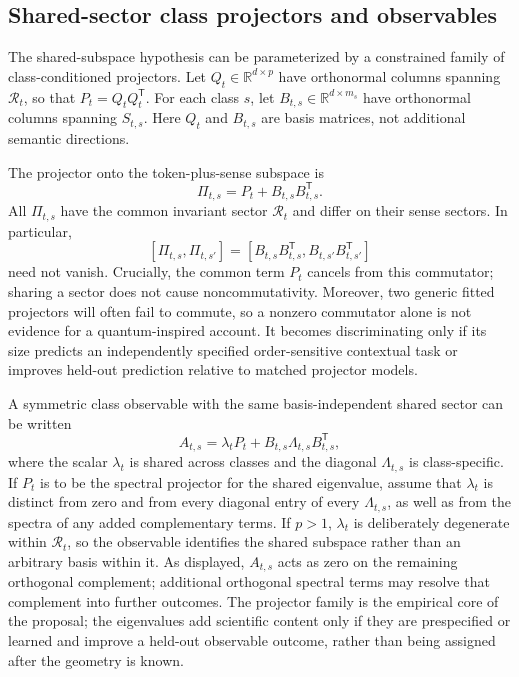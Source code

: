 \documentclass[
  aps,
  reprint,
  superscriptaddress,
  floatfix,
  nofootinbib,
  longbibliography
]{revtex4-2}
\newcommand{\R}{\mathbb{R}}
\newcommand{\T}{^{\mathsf{T}}}
\begin{document}
\subsection{Shared-sector class projectors and observables}
\label{sec:observables}

The shared-subspace hypothesis can be parameterized by a constrained family
of class-conditioned projectors.  Let $Q_t\in\R^{d\times p}$ have orthonormal columns
spanning $\mathcal R_t$, so that $P_t=Q_tQ_t\T$.  For each class $s$, let
$B_{t,s}\in\R^{d\times m_s}$ have orthonormal columns spanning $S_{t,s}$.
Here $Q_t$ and $B_{t,s}$ are basis matrices, not additional semantic
directions.

The projector onto the token-plus-sense subspace is
%
\begin{equation}
\label{eq:context-projector}
\Pi_{t,s}=P_t+B_{t,s}B_{t,s}\T .
\end{equation}
%
All $\Pi_{t,s}$ have the common invariant sector $\mathcal R_t$ and differ on
their sense sectors.  In particular,
%
\begin{equation}
\label{eq:projector-commutator}
[\Pi_{t,s},\Pi_{t,s'}]
=
[B_{t,s}B_{t,s}\T,B_{t,s'}B_{t,s'}\T]
\end{equation}
%
need not vanish.  Crucially, the common term $P_t$ cancels from this
commutator; sharing a sector does not cause noncommutativity.  Moreover, two
generic fitted projectors will often fail to commute, so a nonzero commutator
alone is not evidence for a quantum-inspired account.  It becomes
discriminating only if its size predicts an independently specified
order-sensitive contextual task or improves held-out prediction relative to
matched projector models.

A symmetric class observable with the same basis-independent shared sector
can be written
%
\begin{equation}
\label{eq:context-observable}
A_{t,s}
=\lambda_t P_t
 +B_{t,s}\Lambda_{t,s}B_{t,s}\T,
\end{equation}
%
where the scalar $\lambda_t$ is shared across classes and the diagonal
$\Lambda_{t,s}$ is class-specific.  If $P_t$ is to be the spectral projector
for the shared eigenvalue, assume that $\lambda_t$ is distinct from zero and
from every diagonal entry of every $\Lambda_{t,s}$, as well as from the spectra
of any added complementary terms.  If $p>1$, $\lambda_t$ is deliberately
degenerate within $\mathcal R_t$, so the observable identifies the shared
subspace rather than an arbitrary basis within it.  As displayed, $A_{t,s}$
acts as zero on the remaining orthogonal complement; additional orthogonal
spectral terms may resolve that complement into further outcomes.  The projector
family is the empirical core of the proposal; the eigenvalues add scientific
content only if they are prespecified or learned and improve a held-out
observable outcome, rather than being assigned after the geometry is known.
\end{document}
